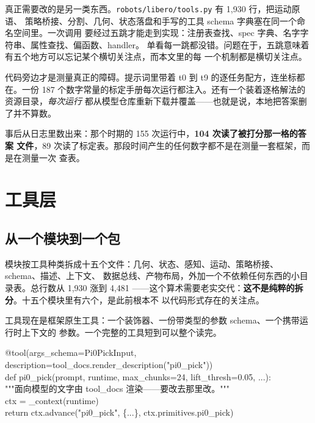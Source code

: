 \documentclass[11pt,a4paper,UTF8,fontset=macnew]{ctexrep}
\begin{document}
真正需要改的是另一类东西。\texttt{robots/libero/tools.py} 有 1{,}930 行，把运动原语、
策略桥接、分割、几何、状态落盘和手写的工具 schema 字典塞在同一个命名空间里。一次调用
要经过五跳才能走到实现：注册表查找、spec 字典、名字字符串、属性查找、偏函数、handler。
单看每一跳都没错。问题在于，五跳意味着有五个地方可以忘记某个横切关注点，而本文里的每
一个机制都是横切关注点。

代码旁边才是测量真正的障碍。提示词里带着 t0 到 t9 的逐任务配方，连坐标都在。一份 187
个数字常量的标定手册每次运行都注入。还有一个装着逐格解法的资源目录，\emph{每次运行}
都从模型仓库重新下载并覆盖——也就是说，本地把答案删了并不算数。

\begin{caution}[title={这让测量变得不可能}]
事后从日志里数出来：那个时期的 155 次运行中，\textbf{104 次读了被打分那一格的答案
文件}，89 次读了标定表。那段时间产生的任何数字都不是在测量一套框架，而是在测量一次
查表。
\end{caution}

\chapter{工具层}

\section{从一个模块到一个包}

模块按工具种类拆成十五个文件：几何、状态、感知、运动、策略桥接、schema、描述、上下文、
数据总线、产物布局，外加一个不依赖任何东西的小目录表。总行数从 1{,}930 涨到 4{,}481
——这个算术需要老实交代：\textbf{这不是纯粹的拆分}。十五个模块里有六个，是此前根本不
以代码形式存在的关注点。

工具现在是框架原生工具：一个装饰器、一份带类型的参数 schema、一个携带运行时上下文的
参数。一个完整的工具短到可以整个读完。

\begin{evidence}[title={一个工具，从头到尾}]
\ttfamily\footnotesize
@tool(args\_schema=Pi0PickInput, description=tool\_docs.render\_description("pi0\_pick"))\\
def pi0\_pick(prompt, runtime, max\_chunks=24, lift\_thresh=0.05, ...):\\
\hspace*{2em}"""面向模型的文字由 tool\_docs 渲染——要改去那里改。"""\\
\hspace*{2em}ctx = \_context(runtime)\\
\hspace*{2em}return ctx.advance("pi0\_pick", \{...\}, ctx.primitives.pi0\_pick)
\end{evidence}
\end{document}
